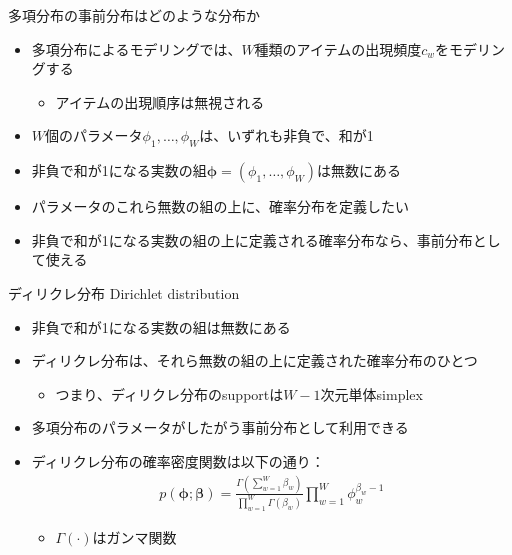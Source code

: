 \documentclass[aspectratio=169,unicode,dvipdfmx,14pt]{beamer}
\begin{document}
\begin{frame}{多項分布の事前分布はどのような分布か}
\begin{itemize}
\item 多項分布によるモデリングでは、$W$種類のアイテムの出現頻度$c_w$をモデリングする
\begin{itemize}
\item アイテムの出現順序は無視される
\end{itemize}
\item $W$個のパラメータ$\phi_1,\ldots,\phi_W$は、いずれも非負で、和が1
\item 非負で和が1になる実数の組$\bm{\phi}=(\phi_1,\ldots,\phi_W)$は無数にある
\item パラメータのこれら無数の組の上に、確率分布を定義したい
\item 非負で和が1になる実数の組の上に定義される確率分布なら、事前分布として使える
\end{itemize}
\end{frame}

\begin{frame}{ディリクレ分布 Dirichlet distribution}
\begin{itemize}
\item 非負で和が1になる実数の組は無数にある
\item ディリクレ分布は、それら無数の組の上に定義された確率分布のひとつ
\begin{itemize}
\item つまり、ディリクレ分布のsupportは$W-1$次元単体simplex
\end{itemize}
\item 多項分布のパラメータがしたがう事前分布として利用できる
\item ディリクレ分布の確率密度関数は以下の通り：
\begin{align}
p(\bm{\phi};\bm{\beta})=\frac{\Gamma(\sum_{w=1}^W \beta_w)}{\prod_{w=1}^W\Gamma(\beta_w)}
\prod_{w=1}^W \phi_w^{\beta_w - 1}
\end{align}
\begin{itemize}
\item $\Gamma(\cdot)$はガンマ関数
\end{itemize}
\end{itemize}
\end{frame}
\end{document}
